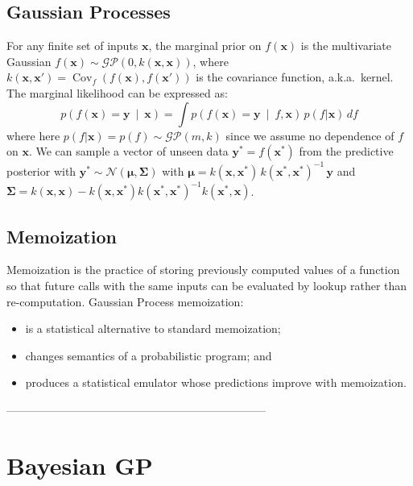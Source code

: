 \documentclass[a0,portrait]{a0poster}
\newcommand{\xbf}{\mathbf{x}}
\newcommand{\ybf}{\mathbf{y}}
\newcommand{\pn}[1]{\left( #1 \right)}
\newcommand{\mvert}{\ \middle\vert\ }
\DeclareMathOperator*{\Cov}{Cov}
\begin{document}
\begin{multicols}{2}
\subsection*{Gaussian Processes}
For any finite set of inputs $\xbf$, the marginal prior on $f(\xbf)$ is the multivariate Gaussian $f(\xbf) \sim \mathcal{GP}(0, k(\xbf,\xbf))$,
where $k(\xbf,\xbf') = \Cov_f\pn{f(\xbf), f(\xbf')}$ is the covariance function, a.k.a.\ kernel.
The marginal likelihood can be expressed as:
\begin{equation*}
\label{eq:marg}
p\pn{f(\xbf) = \ybf \mvert \xbf} = \int p\pn{f(\xbf) = \ybf \mvert f, \xbf}\, p(f|\xbf) \, df
\end{equation*}
where here $p(f|\xbf) = p(f) \sim \mathcal{GP}(m,k)$ since we assume no dependence of $f$ on $\xbf$.
We can sample a vector of unseen data $\ybf^* = f(\xbf^*)$ from the predictive posterior with
$\ybf^* \sim \mathcal{N}(\bm{\mu},\bm{\Sigma})$
with $\bm{\mu} = k(\xbf,\xbf^*)\, k(\xbf^*,\xbf^*)^{-1}\, \ybf$ and $\bm{\Sigma} =  k(\xbf,\xbf) - k(\xbf,\xbf^*)k(\xbf^*,\xbf^*)^{-1} k(\xbf^*,\xbf)$.

\subsection*{Memoization}
Memoization is the practice of storing previously computed values of a function so that future calls
with the same inputs can be evaluated by lookup rather than re-computation. Gaussian Process memoization: 

\begin{itemize}
\setlength{\itemindent}{1cm}
 \item is a statistical alternative to standard memoization;
 \item changes semantics of a probabilistic program; and
 \item produces a statistical emulator whose predictions improve with memoization.
\end{itemize}


---------------------------------------------------------------------


\section*{Bayesian GP}


\end{multicols}
\end{document}
